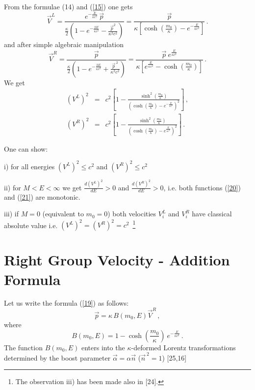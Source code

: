 \documentclass[a4paper,12pt]{article}
\begin{document}
From the formulae (14) and (\ref{15}) one   gets
\begin{equation}\label{18}
  \vec{V}^L = \frac{e^{- \frac{E}{\kappa c^2}} \, \vec{p}}{ \frac{\kappa}{2}
\left( 1 - e^{-\frac{2E}{\kappa c^2}} - \frac{\vec{p}^2}{\kappa^2 c^2}\right)}
=  \frac{\vec{p} }{\kappa\left[\cosh(\frac{m_0}{\kappa}) - e^{-\frac{E}{\kappa
c^2}}\right]} \, .
\end{equation}
and after simple algebraic manipulation
\begin{equation}\label{19}
\vec{V}^R =  \frac{\vec{p}}{ \frac{\kappa}{2} \left( 1 - e^{-
\frac{2E}{\kappa c^2}} + \frac{\vec{p}^{\ 2}}{\kappa^2 c^2}
\right)} = \frac{\vec{p} \ e^\frac{E}{\kappa
c^2}}{\kappa\left[e^{\frac{E}{\kappa c^2}} -
\cosh(\frac{m_0}{\kappa}) \right]}\, .
\end{equation}
We get
\begin{eqnarray}\label{20}
(V^L )^2 & = & c^2 \left[1 - \frac{\sinh^2(\frac{m_0}{\kappa})}{\left(\cosh
(\frac{m_0}{\kappa}) - e^{-\frac{E}{\kappa c^2}}\right)^2}\right]  \, ,
\\
\label{21}
  (V^R )^2 & = &  c^2 \left[1 - \frac{\sinh^2(\frac{m_0}{\kappa})}{\left(\cosh
(\frac{m_0}{\kappa}) - e^{\frac{E}{\kappa c^2}}\right)^2}\right]\, .
\end{eqnarray}


One can show:

i) for all energies $(V^L)^2\leq c^2$ and $(V^R)^2\leq c^2$

ii) for $M<E< \infty$ we get $\frac{d(V^L)^2}{dE}
> 0$ and $\frac{d(V^R)^2}{dE}  > 0$, i.e. both functions
(\ref{20}) and (\ref{21}) are monotonic.

iii) if $M=0$ (equivalent to $m_0 = 0$) both velocities $V^L_i$
and $V^R_i$ have classical absolute value  i.e.  $(V^L)^2
=(V^R)^2=c^2$ \,\footnote{The observation iii) has been made also
in [24].}

\section{Right Group Velocity - Addition Formula}

Let us write the formula (\ref{19}) as follows:
\begin{equation}\label{22}
  \vec{p}= \kappa \, B ( m_0 , E)
  \vec{V}^R\, ,
\end{equation}
where
\begin{equation}\label{23}
  B( m_0 , E) = 1 - \cosh(\frac{m_0}{\kappa}) \ e^{-\frac{E}{\kappa c^2}}\, .
\end{equation}
The function $B( m_0 , E)$ enters into the $\kappa$-deformed Lorentz
transformations determined by the boost parameter $ \vec{\alpha} = \alpha
\vec{n}$ ($\vec{n}^{\ 2} = 1$) [25,16]
\end{document}
